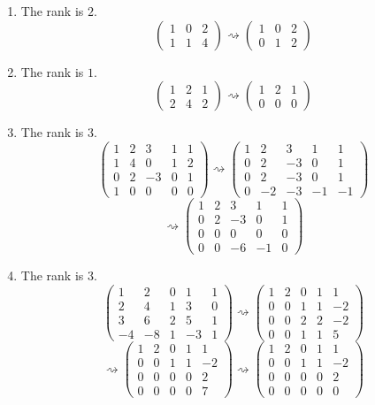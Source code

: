 \begin{enumerate}
\begin{enumerate}
\item The rank is $2$.
\[\left(\begin{array}{ccc}1&0&2\\1&1&4\end{array}\right)\rightsquigarrow \left(\begin{array}{ccc}1&0&2\\0&1&2\end{array}\right)\]
\item The rank is $1$.
\[\left(\begin{array}{ccc}1&2&1\\2&4&2\end{array}\right)\rightsquigarrow \left(\begin{array}{ccc}1&2&1\\0&0&0\end{array}\right)\]
\item The rank is $3$.
\[\left(\begin{array}{ccccc}1&2&3&1&1\\1&4&0&1&2\\0&2&-3&0&1\\1&0&0&0&0 \end{array}\right)\rightsquigarrow \left(\begin{array}{ccccc}1&2&3&1&1\\0&2&-3&0&1\\0&2&-3&0&1\\0&-2&-3&-1&-1 \end{array}\right)\]
\[\rightsquigarrow \left(\begin{array}{ccccc}1&2&3&1&1\\0&2&-3&0&1\\0&0&0&0&0\\0&0&-6&-1&0 \end{array}\right)\]
\item The rank is $3$.
\[\left(\begin{array}{ccccc}1&2&0&1&1\\2&4&1&3&0\\3&6&2&5&1\\-4&-8&1&-3&1 \end{array}\right)\rightsquigarrow \left(\begin{array}{ccccc}1&2&0&1&1\\0&0&1&1&-2\\0&0&2&2&-2\\0&0&1&1&5 \end{array}\right)\]
\[\rightsquigarrow \left(\begin{array}{ccccc}1&2&0&1&1\\0&0&1&1&-2\\0&0&0&0&2\\0&0&0&0&7 \end{array}\right)\rightsquigarrow \left(\begin{array}{ccccc}1&2&0&1&1\\0&0&1&1&-2\\0&0&0&0&2\\0&0&0&0&0 \end{array}\right)\]

\end{enumerate}
\end{enumerate}
